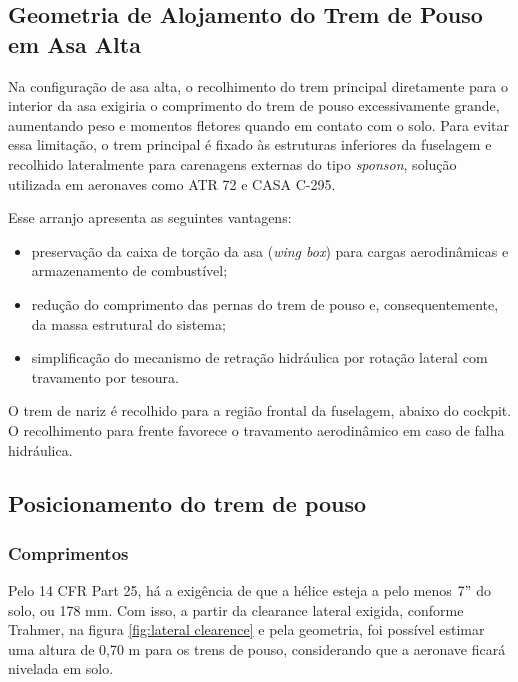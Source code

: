\subsection{Geometria de Alojamento do Trem de Pouso em Asa Alta}

Na configuração de asa alta, o recolhimento do trem principal diretamente para o interior da asa exigiria o comprimento do trem de pouso excessivamente grande, aumentando peso e momentos fletores quando em contato com o solo. Para evitar essa limitação, o trem principal é fixado às estruturas inferiores da fuselagem e recolhido lateralmente para carenagens externas do tipo \textit{sponson}, solução utilizada em aeronaves como ATR 72 e CASA C-295.

Esse arranjo apresenta as seguintes vantagens:

\begin{itemize}
    \item preservação da caixa de torção da asa (\textit{wing box}) para cargas aerodinâmicas e armazenamento de combustível;

    \item redução do comprimento das pernas do trem de pouso e, consequentemente, da massa estrutural do sistema;

    \item simplificação do mecanismo de retração hidráulica por rotação lateral com travamento por tesoura.
\end{itemize}

O trem de nariz é recolhido para a região frontal da fuselagem, abaixo do cockpit. O recolhimento para frente favorece o travamento aerodinâmico em caso de falha hidráulica.

\subsection{Posicionamento do trem de pouso}
\label{sec:posicionamento_tdp}

\subsubsection{Comprimentos}

Pelo 14 CFR Part 25, há a exigência de que a hélice esteja a pelo menos $7"$ do solo, ou 178 mm. Com isso, a partir da clearance lateral exigida, conforme Trahmer, na figura \ref{fig:lateral clearence} e pela geometria, foi possível estimar uma altura de 0,70 m para os trens de pouso, considerando que a aeronave ficará nivelada em solo.

